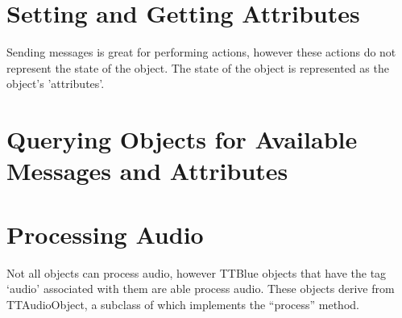 

\section{Setting and Getting Attributes}

Sending messages is great for performing actions, however these actions do not represent the state of the object.
The state of the object is represented as the object's 'attributes'.



\section{Querying Objects for Available Messages and Attributes}



\section{Processing Audio}

Not all objects can process audio, however TTBlue objects that have the tag ‘audio’ associated with them are able process audio.  These objects derive from TTAudioObject, a subclass of  which implements the “process” method.



